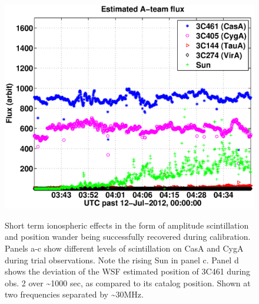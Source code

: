 \documentclass[referee]{aa}
\begin{document}
\begin{figure}[tbh]
{\includegraphics[width=\columnwidth]{Figs/combined_SB002_2_convcalsol_bin_sigmas.eps}}

\caption{\label{fig:Estimated-flux-of}Short term ionospheric effects in the form
  of amplitude  scintillation and  position wander being  successfully recovered
  during calibration. Panels a-c show  different levels of scintillation on CasA
  and CygA  during trial observations. Note the  rising Sun in panel  c. Panel d
  shows the deviation of the WSF  estimated position of 3C461 during obs. 2 over
  \textasciitilde{}1000 sec, as  compared to its catalog position.  Shown at two
  frequencies separated by \textasciitilde{}30MHz.}
\end{figure}
\end{document}
